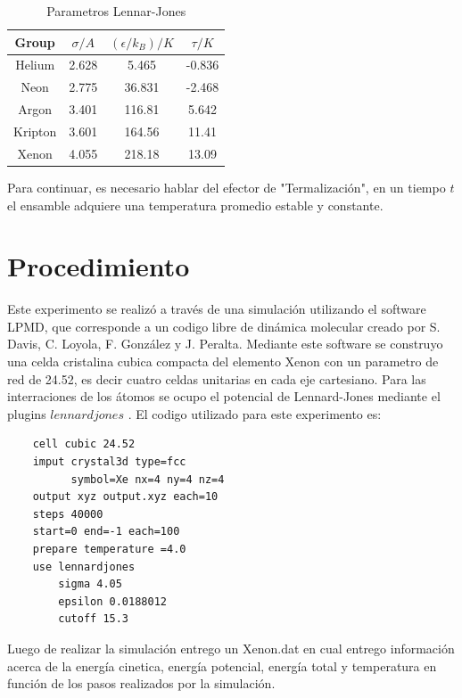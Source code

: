 \documentclass[10pt,letterpaper,twocolumn]{article}
\begin{document}
\begin{table}[h] %
\centering %
\begin{tabular}{cccc}
\toprule
Group & $\sigma / A $& $(\epsilon/k_{B})/K$ & $\tau/K$ \\
\midrule 
Helium  & 2.628 & 5.465 & -0.836 \\
Neon  & 2.775 & 36.831 & -2.468\\ 
Argon  & 3.401 & 116.81 & 5.642\\
Kripton  & 3.601 & 164.56 & 11.41\\
Xenon & 4.055 & 218.18 & 13.09\\

\bottomrule
\end{tabular}
\caption{Parametros Lennar-Jones}
\label{tab:periodos_oscilacion}
\end{table}

Para continuar, es necesario hablar del efector de "Termalización", en un tiempo $t$ el ensamble adquiere una temperatura promedio estable y constante. 
\section*{Procedimiento}

Este experimento se  realizó a través de una simulación utilizando el software LPMD, que corresponde a un codigo libre de dinámica molecular creado por S. Davis, C. Loyola, F. González y J. Peralta. Mediante este software se construyo una celda cristalina cubica compacta del elemento Xenon con un parametro de red de 24.52, es decir cuatro celdas unitarias en cada eje cartesiano. Para las interraciones de los átomos se ocupo el potencial de Lennard-Jones mediante el plugins $lennardjones$ .
El codigo utilizado para este experimento es:


\begin{lstlisting}
    cell cubic 24.52
    imput crystal3d type=fcc 
          symbol=Xe nx=4 ny=4 nz=4
    output xyz output.xyz each=10
    steps 40000
    start=0 end=-1 each=100 
    prepare temperature =4.0
    use lennardjones
        sigma 4.05
        epsilon 0.0188012
        cutoff 15.3
\end{lstlisting}

Luego de realizar la simulación entrego un Xenon.dat en cual entrego información acerca de la energía cinetica, energía potencial, energía total y temperatura en función de los pasos realizados por la simulación. 
\end{document}
